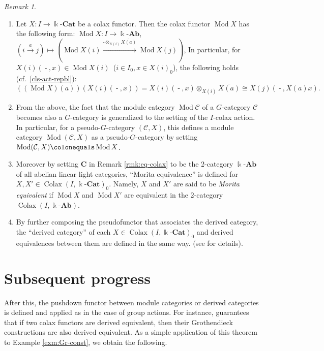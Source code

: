 \documentclass{surv-l}
\numberwithin{equation}{chapter}
\numberwithin{figure}{chapter}
\theoremstyle{plain}
\theoremstyle{definition}
\theoremstyle{remark}
\newtheorem{rmk}[thm]{Remark}
\newcommand{\kCat}{\Bbbk\text{-}\mathbf{Cat}}
\newcommand{\kAb}{\Bbbk\text{-}\mathbf{Ab}}
\DeclareMathOperator{\Mod}{Mod}
\DeclareMathOperator{\blank}{-}
\DeclareMathOperator{\Colax}{Colax}
\begin{document}
\begin{rmk}\leavevmode
\label{rmk:ModX}
\begin{enumerate}
\item Let $X \colon I \to \kCat$ be a colax functor.
Then the colax functor $\Mod X$ has the following form:
$\Mod X\colon I \to \kAb$,
$(i \xrightarrow{a} j) \mapsto (\Mod X(i) \xrightarrow{\blank\otimes_{X(i)} \overline{X(a)}} \Mod X(j))$,
In particular, for $X(i)(\blank, x) \in \Mod X(i)$\ ($i\in I_0, x \in X(i)_0$),
the following holds (cf.\ \eqref{cls-act-repbl}):
\begin{equation}\label{eq:general-act-repbl}
((\Mod X)(a))(X(i)(\blank, x)) = X(i)(\blank, x)\otimes_{X(i)}\overline{X(a)}\cong X(j)(\blank, X(a)x).
\end{equation}
\item From the above, the fact that the module category $\Mod {\mathcal{C}}$ of a $G$-category
${\mathcal{C}}$ becomes also a $G$-category is generalized to the setting of the $I$-colax action.
In particular, for a pseudo-$G$-category $({\mathcal{C}}, X)$,
this defines a module category $\Mod ({\mathcal{C}}, X)$ as a pseudo-$G$-category
by setting $\Mod ({\mathcal{C}}, X)\colonequals  \Mod X$.
\item Moreover by setting $\mathbf{C}$ in Remark \ref{rmk:eq-colax} to be
the 2-category $\kAb$ of all abelian linear light categories,
``Morita equivalence'' is defined for
$X, X' \in \Colax(I, \kCat)_0$.
Namely, $X$ and $X'$ are said to be \emph{Morita equivalent} if
$\Mod X$ and $\Mod X'$ are equivalent in the 2-category $\Colax(I, \kAb)$.
\item By further composing the pseudofunctor that associates the derived category,
the ``derived category'' of each $X \in \Colax(I, \kCat)_0$ and
derived equivalences between them are defined in the same way.
(see \cite{Asa-b} for details).
\end{enumerate}
\end{rmk}

\section{Subsequent progress}

After this, the pushdown functor between module categories
or derived categories is defined and applied as in the case of group actions.
For instance, \cite[Therorem 8.1]{Asa-b} guarantees that if two colax functors
are derived equivalent, then their Grothendieck constructions are also derived equivalent.
As a simple application of this theorem to Example \ref{exm:Gr-const}, we obtain the following.
\end{document}
